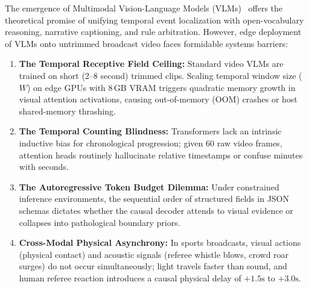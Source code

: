 \documentclass[10pt,twocolumn,letterpaper]{article}
\begin{document}
The emergence of Multimodal Vision-Language Models (VLMs)~\cite{qwen2025qwen25vl,openbmb2024minicpmv,liquid2025lfm,chen2024internvl} offers the theoretical promise of unifying temporal event localization with open-vocabulary reasoning, narrative captioning, and rule arbitration. However, edge deployment of VLMs onto untrimmed broadcast video faces formidable systems barriers:
\begin{enumerate}
    \item \textbf{The Temporal Receptive Field Ceiling:} Standard video VLMs are trained on short (2--8 second) trimmed clips. Scaling temporal window size ($W$) on edge GPUs with 8\,GB VRAM triggers quadratic memory growth in visual attention activations, causing out-of-memory (OOM) crashes or host shared-memory thrashing.
    \item \textbf{The Temporal Counting Blindness:} Transformers lack an intrinsic inductive bias for chronological progression; given 60 raw video frames, attention heads routinely hallucinate relative timestamps or confuse minutes with seconds.
    \item \textbf{The Autoregressive Token Budget Dilemma:} Under constrained inference environments, the sequential order of structured fields in JSON schemas dictates whether the causal decoder attends to visual evidence or collapses into pathological boundary priors.
    \item \textbf{Cross-Modal Physical Asynchrony:} In sports broadcasts, visual actions (physical contact) and acoustic signals (referee whistle blows, crowd roar surges) do not occur simultaneously; light travels faster than sound, and human referee reaction introduces a causal physical delay of $+1.5\text{s}$ to $+3.0\text{s}$.
\end{enumerate}
\end{document}

